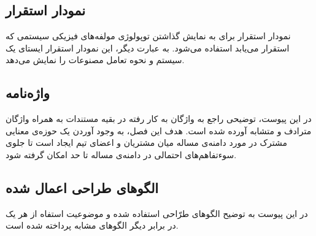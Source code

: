 \subsection{نمودار استقرار}
نمودار استقرار برای به نمایش گذاشتن توپولوژی مولفه‌های فیزیکی سیستمی که استقرار می‌یابد استفاده می‌شود. به عبارت دیگر، این نمودار استقرار ایستای یک سیستم و نحوه تعامل مصنوعات
 را نمایش می‌دهد.

\subsection{واژه‌نامه}
در این پیوست، توضیحی راجع به واژگان به کار رفته در بقیه مستندات به همراه واژگان مترادف و متشابه آورده شده است. هدف این فصل، به وجود آوردن یک حوزه‌ی معنایی مشترک در مورد دامنه‌ی مساله میان مشتریان و اعضای تیم ایجاد است  تا جلوی سوء‌تفاهم‌های احتمالی در دامنه‌ی مساله تا حد امکان گرفته شود.

\subsection{الگوهای طراحی اعمال شده}
در این پیوست به توضیح الگوهای طرّاحی استفاده شده و موضوعیت استفاه از هر یک در برابر دیگر الگوهای مشابه پرداخته شده است.
